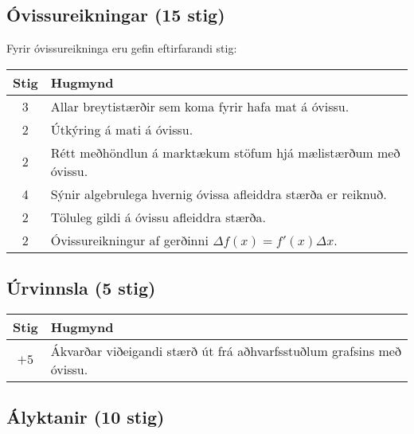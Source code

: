 \begin{tcolorbox}
\end{tcolorbox}

\newpage

\begin{tcolorbox}

\subsection*{Óvissureikningar (15 stig)}

Fyrir óvissureikninga eru gefin eftirfarandi stig:

\begin{table}[H]
    \centering
    \begin{tabular}{|c|l|}
    \hline
       \textbf{Stig}  & \textbf{Hugmynd}   \\ \hline \hline
        3  & Allar breytistærðir sem koma fyrir hafa mat á óvissu. \\ \hline
        2  & Útkýring á mati á óvissu. \\ \hline
        2  & Rétt meðhöndlun á marktækum stöfum hjá mælistærðum með óvissu. \\ \hline
        4  & Sýnir algebrulega hvernig óvissa afleiddra stærða er reiknuð. \\ \hline
        2  & Töluleg gildi á óvissu afleiddra stærða.  \\ \hline
        2 & Óvissureikningur af gerðinni $\Delta f(x) = f'(x) \Delta x$.  \\ \hline 
    \end{tabular}
\end{table}


\subsection*{Úrvinnsla (5 stig)}

\begin{table}[H]
    \centering
    \begin{tabular}{|c|l|}
    \hline
       \textbf{Stig}  & \textbf{Hugmynd}   \\ \hline \hline
       $+5$ & Ákvarðar viðeigandi stærð út frá aðhvarfsstuðlum grafsins með óvissu.   \\ \hline
    \end{tabular}
\end{table}





\subsection*{Ályktanir (10 stig)}


\end{tcolorbox}
